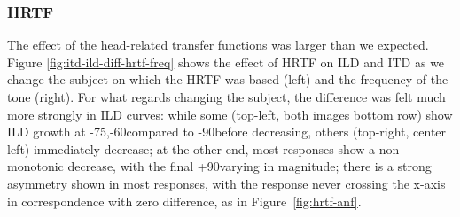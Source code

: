 \documentclass[11pt,a4paper]{article}
\begin{document}
\subsubsection{HRTF}
The effect of the head-related transfer functions was larger than we expected. Figure \ref{fig:itd-ild-diff-hrtf-freq} shows the effect of HRTF on ILD and ITD as we change the subject on which the HRTF was based (left) and the frequency of the tone (right). For what regards changing the subject, the difference was felt much more strongly in ILD curves: while some (top-left, both images bottom row) show ILD growth at -75\degree,-60\degree compared to -90\degree before decreasing, others (top-right, center left) immediately decrease; at the other end, most responses show a non-monotonic decrease, with the final +90\degree varying in magnitude; there is a strong asymmetry shown in most responses, with the response never crossing the x-axis in correspondence with zero difference, as in Figure~\ref{fig:hrtf-anf}. 
\end{document}
